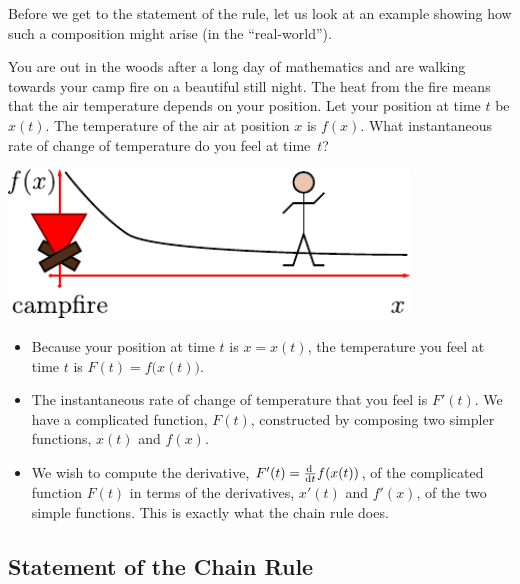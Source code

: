 Before we get to the statement of the rule, let us look at an
example showing how such a composition might arise (in the  ``real-world'').

\begin{eg}
\label{eg:DIFFcampfire}
You are out in the woods after a long day of mathematics and are
walking towards your camp fire on a beautiful still night. The heat
from the fire means that the air temperature depends on your position.
Let your position at time $t$ be $x(t)$. The temperature of the air
at position $x$ is $f(x)$. What instantaneous rate of change of
temperature do you feel at time~$t$?
\begin{efig}
\begin{center}
 \includegraphics[width=0.8\textwidth]{campfire2}
\end{center}
\end{efig}
\begin{itemize}
 \item Because your position at time $t$ is $x=x(t)$, the temperature you feel
at time $t$ is $F(t)=f\big(x(t)\big)$.
\item The instantaneous rate of change of temperature that you feel is $F'(t)$. We have a
complicated function, $F(t)$, constructed by composing two simpler functions, $x(t)$ and
$f(x)$.
\item We wish to compute the derivative, $F'(t) = \diff{}{t} f( x(t) )$,
of the complicated function $F(t)$ in terms of the derivatives,  $x'(t)$
and $f'(x)$, of the two simple functions. This is exactly what the
chain rule does.
\end{itemize}
\end{eg}


\subsection*{Statement of the Chain Rule}

